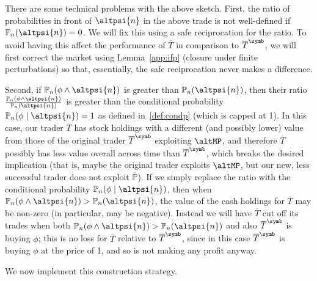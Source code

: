 \documentclass[authordate,onecolumn,noenvironments]{miri-tech-article}
\numberwithin{equation}{subsection}
\newcommand{\seq}[1]{{\overline{#1}}}
\newcommand{\trade}{T}%
\newcommand{\Trader}{\seq{\trade}} %
\newcommand{\BelState}{\mathbb{P}}
\newcommand{\pt}{\BelState}
\newcommand{\MP}{\seq{\pt}}
\begin{document}
There are some technical problems with the above sketch. First, the ratio of probabilities in front of $\altpsi{n}$ in the above trade is not well-defined if 
$\pt_n(\altpsi{n})=0$. We will fix this using a safe reciprocation for the ratio. To avoid having this affect the performance of  $\Trader$ in comparison to  $\Trader^\symb$, we will first correct the market using Lemma~\ref{app:ifp} (closure under finite perturbations) so that, essentially, the safe reciprocation never makes a difference.

Second, if 
$\pt_n(\phi \wedge \altpsi{n})$ is greater than   $\pt_n(\altpsi{n})$, then their ratio $\frac{\pt_n(\phi \wedge \altpsi{n})}{\pt_n(\altpsi{n})}$ is greater than the conditional probability $\pt_n(\phi \mid
\altpsi{n}) = 1$ as
defined in~\ref{def:condp} (which is capped at 1). In this case, our trader  $\Trader$  has stock holdings with a different (and possibly lower) value from those of the original trader  $\Trader^\symb$ exploiting
$\altMP$, and therefore  $\Trader$ possibly has less value overall across time than  $\Trader^\symb$, which breaks the desired implication (that is, maybe the original trader exploits $\altMP$, but our new, less successful trader does not exploit $\MP$). If we simply replace the ratio with the conditional probability 
$\pt_n(\phi \mid \altpsi{n}) $, then when $\pt_n(\phi \wedge \altpsi{n}) > \pt_n(\altpsi{n}) $, the value of the cash holdings for  $\Trader$ may be non-zero (in particular, may be negative). Instead
we will have $\Trader$ cut off its trades when both $\pt_n(\phi \wedge \altpsi{n}) > \pt_n(\altpsi{n}) $ and also $\Trader^\symb$ is buying $\phi$; this is no loss for $\Trader$ relative to $\Trader^\symb$, since in this case $\Trader^\symb$ is buying $\phi$ at the price of 1, and so is not making any profit anyway. 

We now implement this construction strategy. 

\newcommand{\csell}{{\rm Sell}}
\newcommand{\cbuy}{{\rm Buy}}
\end{document}

